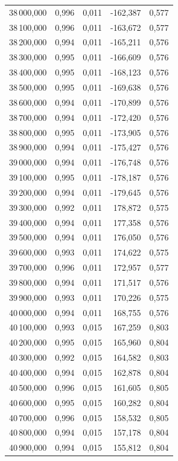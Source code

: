 \begin{longtable}{rrrrr}
38\,000,000 & 0,996 & 0,011 & -162,387 & 0,577\\
38\,100,000 & 0,996 & 0,011 & -163,672 & 0,577\\
38\,200,000 & 0,994 & 0,011 & -165,211 & 0,576\\
38\,300,000 & 0,995 & 0,011 & -166,609 & 0,576\\
38\,400,000 & 0,995 & 0,011 & -168,123 & 0,576\\
38\,500,000 & 0,995 & 0,011 & -169,638 & 0,576\\
38\,600,000 & 0,994 & 0,011 & -170,899 & 0,576\\
38\,700,000 & 0,994 & 0,011 & -172,420 & 0,576\\
38\,800,000 & 0,995 & 0,011 & -173,905 & 0,576\\
38\,900,000 & 0,994 & 0,011 & -175,427 & 0,576\\
39\,000,000 & 0,994 & 0,011 & -176,748 & 0,576\\
39\,100,000 & 0,995 & 0,011 & -178,187 & 0,576\\
39\,200,000 & 0,994 & 0,011 & -179,645 & 0,576\\
39\,300,000 & 0,992 & 0,011 & 178,872 & 0,575\\
39\,400,000 & 0,994 & 0,011 & 177,358 & 0,576\\
39\,500,000 & 0,994 & 0,011 & 176,050 & 0,576\\
39\,600,000 & 0,993 & 0,011 & 174,622 & 0,575\\
39\,700,000 & 0,996 & 0,011 & 172,957 & 0,577\\
39\,800,000 & 0,994 & 0,011 & 171,517 & 0,576\\
39\,900,000 & 0,993 & 0,011 & 170,226 & 0,575\\
40\,000,000 & 0,994 & 0,011 & 168,755 & 0,576\\
40\,100,000 & 0,993 & 0,015 & 167,259 & 0,803\\
40\,200,000 & 0,995 & 0,015 & 165,960 & 0,804\\
40\,300,000 & 0,992 & 0,015 & 164,582 & 0,803\\
40\,400,000 & 0,994 & 0,015 & 162,878 & 0,804\\
40\,500,000 & 0,996 & 0,015 & 161,605 & 0,805\\
40\,600,000 & 0,995 & 0,015 & 160,282 & 0,804\\
40\,700,000 & 0,996 & 0,015 & 158,532 & 0,805\\
40\,800,000 & 0,994 & 0,015 & 157,178 & 0,804\\
40\,900,000 & 0,994 & 0,015 & 155,812 & 0,804\\

\end{longtable}
